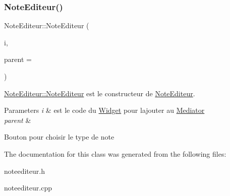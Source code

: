 \subsubsection{\texorpdfstring{Note\+Editeur()}{NoteEditeur()}}
{\footnotesize\ttfamily Note\+Editeur\+::\+Note\+Editeur (\begin{DoxyParamCaption}\item[{unsigned int}]{i,  }\item[{Q\+Widget $\ast$}]{parent = {} }\end{DoxyParamCaption})}



\hyperlink{classNoteEditeur_a1671a54cf740cf1d7625e7e7f6e7939c}{Note\+Editeur\+::\+Note\+Editeur} est le constructeur de \hyperlink{classNoteEditeur}{Note\+Editeur}. 


\begin{DoxyParams}{Parameters}
{\em i} & est le code du \hyperlink{classWidget}{Widget} pour l\textquotesingle{}ajouter au \hyperlink{classMediator}{Mediator} \\
\hline
{\em parent} & \\
\hline
\end{DoxyParams}
Bouton pour choisir le type de note 

The documentation for this class was generated from the following files\+:\begin{DoxyCompactItemize}
\item 
noteediteur.\+h\item 
noteediteur.\+cpp\end{DoxyCompactItemize}
